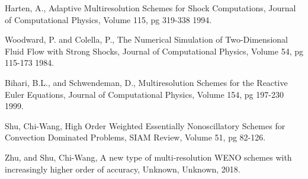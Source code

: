 \documentclass[]{article}
\begin{document}
    \begin{thebibliography}{9}

        Harten, A.,
        Adaptive Multiresolution Schemes for Shock Computations,
        Journal of Computational Physics,
        Volume 115, pg 319-338
        1994.

        Woodward, P. and Colella, P.,
        The Numerical Simulation of Two-Dimensional Fluid Flow with Strong Shocks,
        Journal of Computational Physics,
        Volume 54, pg 115-173
        1984.

	    Bihari, B.L., and Schwendeman, D.,
	    Multiresolution Schemes for the Reactive Euler Equations,
	    Journal of Computational Physics,
        Volume 154, pg 197-230
        1999.

        Shu, Chi-Wang,
        High Order Weighted Essentially Nonoscillatory Schemes for Convection Dominated Problems,
        SIAM Review,
        Volume 51, pg 82-126.

        Zhu, and Shu, Chi-Wang,
        A new type of multi-resolution WENO schemes with increasingly higher order of accuracy,
        Unknown,
        Unknown,
        2018.





    \end{thebibliography}
\end{document}
